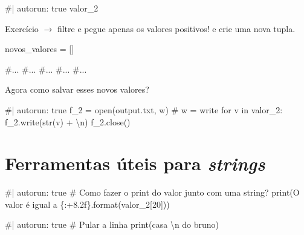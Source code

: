 \documentclass[
  letterpaper,
  DIV=11,
  numbers=noendperiod]{scrreprt}
\newenvironment{Shaded}{\begin{snugshade}}{\end{snugshade}}
\newcommand{\NormalTok}[1]{\textcolor[rgb]{0.00,0.23,0.31}{#1}}
\begin{document}
\begin{Shaded}
\begin{Highlighting}[]
\NormalTok{\#| autorun: true}
\NormalTok{valor\_2}
\end{Highlighting}
\end{Shaded}

Exercício \(\rightarrow\) filtre e pegue apenas os valores positivos! e
crie uma nova tupla.

\begin{Shaded}
\begin{Highlighting}[]
\NormalTok{novos\_valores = []}

\NormalTok{\#...}
\NormalTok{\#...}
\NormalTok{\#...}
\NormalTok{\#...}
\NormalTok{\#...}
\end{Highlighting}
\end{Shaded}

Agora como salvar esses novos valores?

\begin{Shaded}
\begin{Highlighting}[]
\NormalTok{\#| autorun: true}
\NormalTok{f\_2 = open(\textquotesingle{}output.txt\textquotesingle{}, \textquotesingle{}w\textquotesingle{})  \# w = write}
\NormalTok{for v in valor\_2:}
\NormalTok{    f\_2.write(str(v) + \textquotesingle{}\textbackslash{}n\textquotesingle{})}
\NormalTok{f\_2.close()}
\end{Highlighting}
\end{Shaded}

\section{\texorpdfstring{Ferramentas úteis para
\emph{strings}}{Ferramentas úteis para strings}}\label{ferramentas-uxfateis-para-strings}

\begin{Shaded}
\begin{Highlighting}[]
\NormalTok{\#| autorun: true}
\NormalTok{\# Como fazer o print do valor junto com uma string?}
\NormalTok{print(\textquotesingle{}O valor é igual a \{:+8.2f\}\textquotesingle{}.format(valor\_2[20]))}
\end{Highlighting}
\end{Shaded}

\begin{Shaded}
\begin{Highlighting}[]
\NormalTok{\#| autorun: true}
\NormalTok{\# Pular a linha}
\NormalTok{print(\textquotesingle{}casa \textbackslash{}n do bruno\textquotesingle{})}
\end{Highlighting}
\end{Shaded}
\end{document}
